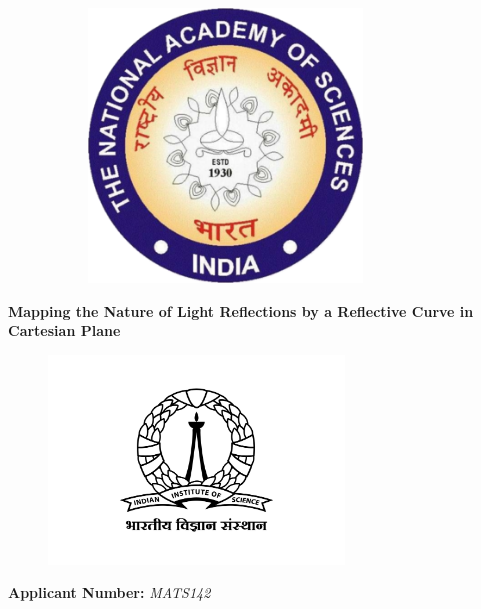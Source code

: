 \documentclass[12pt,a4paper,twoside]{report}
\begin{document}
\begin{titlepage}
\begin{figure}[htb]
\begin{subfigure}[h]{0.3\textwidth}
				\centering
				\includegraphics[width=0.8\textwidth]{nasi.png}
			\end{subfigure}%
		\end{figure}
		
	   \begin{center} 
	   	
	   	
		\vspace{1cm} %
		\Huge
		\textbf{Mapping the Nature of Light Reflections by a Reflective Curve in Cartesian Plane}
		
		\begin{figure}[h]
			\centering
			\includegraphics[width=0.7\textwidth]{iisc.png}
		\end{figure}%
		
		\normalsize
		\textbf{Applicant Number:} \textit{MATS142}
		
		\vspace{0.5cm} %
		

\end{center}
\end{titlepage}
\end{document}
